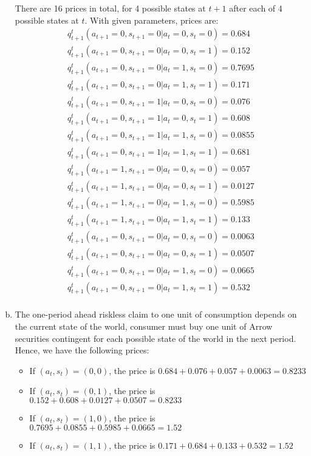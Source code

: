 \documentclass{article}
\begin{document}
\begin{enumerate}[(a)]
  There are 16 prices in total, for 4 possible states at $t+1$ after
  each of 4 possible states at $t$. With given parameters, prices are:
  \begin{gather*}
    q_{t+1}^t(a_{t+1}=0,s_{t+1}=0|a_t=0,s_t=0)=0.684\\
    q_{t+1}^t(a_{t+1}=0,s_{t+1}=0|a_t=0,s_t=1)=0.152\\
    q_{t+1}^t(a_{t+1}=0,s_{t+1}=0|a_t=1,s_t=0)=0.7695\\
    q_{t+1}^t(a_{t+1}=0,s_{t+1}=0|a_t=1,s_t=1)=0.171\\
    q_{t+1}^t(a_{t+1}=0,s_{t+1}=1|a_t=0,s_t=0)=0.076\\
    q_{t+1}^t(a_{t+1}=0,s_{t+1}=1|a_t=0,s_t=1)=0.608\\
    q_{t+1}^t(a_{t+1}=0,s_{t+1}=1|a_t=1,s_t=0)=0.0855\\
    q_{t+1}^t(a_{t+1}=0,s_{t+1}=1|a_t=1,s_t=1)=0.681\\
    q_{t+1}^t(a_{t+1}=1,s_{t+1}=0|a_t=0,s_t=0)=0.057\\
    q_{t+1}^t(a_{t+1}=1,s_{t+1}=0|a_t=0,s_t=1)=0.0127\\
    q_{t+1}^t(a_{t+1}=1,s_{t+1}=0|a_t=1,s_t=0)=0.5985\\
    q_{t+1}^t(a_{t+1}=1,s_{t+1}=0|a_t=1,s_t=1)=0.133\\
    q_{t+1}^t(a_{t+1}=0,s_{t+1}=0|a_t=0,s_t=0)=0.0063\\
    q_{t+1}^t(a_{t+1}=0,s_{t+1}=0|a_t=0,s_t=1)=0.0507\\
    q_{t+1}^t(a_{t+1}=0,s_{t+1}=0|a_t=1,s_t=0)=0.0665\\
    q_{t+1}^t(a_{t+1}=0,s_{t+1}=0|a_t=1,s_t=1)=0.532\\
  \end{gather*}

\item The one-period ahead riskless claim to one unit of consumption
  depends on the current state of the world, consumer must buy one
  unit of Arrow securities contingent for each possible state of the
  world in the next period. Hence, we have the following prices:
  \begin{itemize}
  \item If $(a_t,s_t)=(0,0)$, the price is $0.684+0.076+0.057+0.0063=0.8233$
  \item If $(a_t,s_t)=(0,1)$, the price is $0.152+0.608+0.0127+0.0507=0.8233$
  \item If $(a_t,s_t)=(1,0)$, the price is $0.7695+0.0855+0.5985+0.0665=1.52$
  \item If $(a_t,s_t)=(1,1)$, the price is $0.171+0.684+0.133+0.532=1.52$
  \end{itemize}

\end{enumerate}
\end{document}
